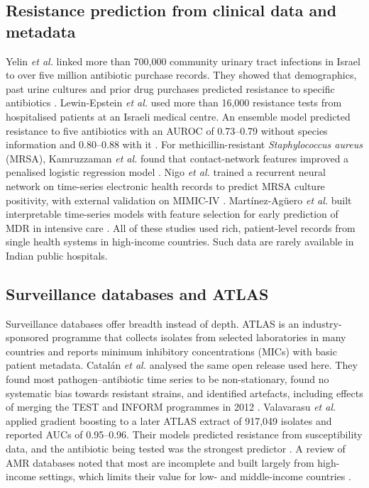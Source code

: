 \documentclass[11pt,a4paper]{article}
\newcommand{\sci}[1]{\textit{#1}}
\begin{document}
\subsection{Resistance prediction from clinical data and metadata}
Yelin \textit{et al.} linked more than 700{,}000 community urinary tract infections in Israel to over five million antibiotic purchase records. They showed that demographics, past urine cultures and prior drug purchases predicted resistance to specific antibiotics \cite{yelin2019}. Lewin-Epstein \textit{et al.} used more than 16{,}000 resistance tests from hospitalised patients at an Israeli medical centre. An ensemble model predicted resistance to five antibiotics with an AUROC of 0.73--0.79 without species information and 0.80--0.88 with it \cite{lewinepstein2021}. For methicillin-resistant \sci{Staphylococcus aureus} (MRSA), Kamruzzaman \textit{et al.} found that contact-network features improved a penalised logistic regression model \cite{kamruzzaman2024}. Nigo \textit{et al.} trained a recurrent neural network on time-series electronic health records to predict MRSA culture positivity, with external validation on MIMIC-IV \cite{nigo2024}. Martínez-Agüero \textit{et al.} built interpretable time-series models with feature selection for early prediction of MDR in intensive care \cite{martinezaguero2022}. All of these studies used rich, patient-level records from single health systems in high-income countries. Such data are rarely available in Indian public hospitals.

\subsection{Surveillance databases and ATLAS}
Surveillance databases offer breadth instead of depth. ATLAS is an industry-sponsored programme that collects isolates from selected laboratories in many countries and reports minimum inhibitory concentrations (MICs) with basic patient metadata. Catal\'an \textit{et al.} analysed the same open release used here. They found most pathogen--antibiotic time series to be non-stationary, found no systematic bias towards resistant strains, and identified artefacts, including effects of merging the TEST and INFORM programmes in 2012 \cite{catalan2022}. Valavarasu \textit{et al.} applied gradient boosting to a later ATLAS extract of 917{,}049 isolates and reported AUCs of 0.95--0.96. Their models predicted resistance from susceptibility data, and the antibiotic being tested was the strongest predictor \cite{valavarasu2025}. A review of AMR databases noted that most are incomplete and built largely from high-income settings, which limits their value for low- and middle-income countries \cite{centner2026}.
\end{document}
